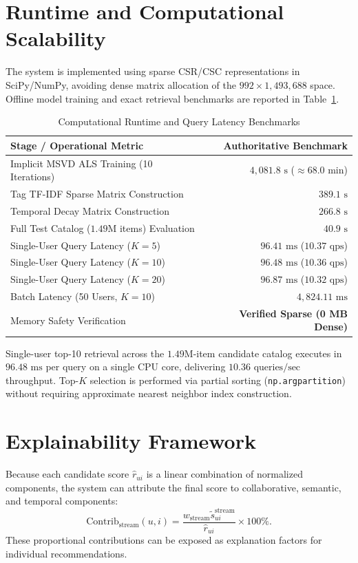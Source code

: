 \documentclass[conference]{IEEEtran}
\begin{document}
\section{Runtime and Computational Scalability}
The system is implemented using sparse CSR/CSC representations in SciPy/NumPy, avoiding dense matrix allocation of the $992 \times 1,493,688$ space. Offline model training and exact retrieval benchmarks are reported in Table~\ref{tab:runtime_benchmarks}.

\begin{table}[t]
\caption{Computational Runtime and Query Latency Benchmarks}
\label{tab:runtime_benchmarks}
\centering
\begin{tabular}{lr}
\toprule
\textbf{Stage / Operational Metric} & \textbf{Authoritative Benchmark} \\
\midrule
Implicit MSVD ALS Training (10 Iterations) & $4,081.8\text{ s}$ ($\approx 68.0\text{ min}$) \\
Tag TF-IDF Sparse Matrix Construction & $389.1\text{ s}$ \\
Temporal Decay Matrix Construction & $266.8\text{ s}$ \\
Full Test Catalog ($1.49\text{M}$ items) Evaluation & $40.9\text{ s}$ \\
\midrule
Single-User Query Latency ($K=5$) & $96.41\text{ ms}$ ($10.37\text{ qps}$) \\
Single-User Query Latency ($K=10$) & $96.48\text{ ms}$ ($10.36\text{ qps}$) \\
Single-User Query Latency ($K=20$) & $96.87\text{ ms}$ ($10.32\text{ qps}$) \\
Batch Latency (50 Users, $K=10$) & $4,824.11\text{ ms}$ \\
Memory Safety Verification & \textbf{Verified Sparse (0 MB Dense)} \\
\bottomrule
\end{tabular}
\end{table}

Single-user top-10 retrieval across the $1.49\text{M}$-item candidate catalog executes in $96.48\text{ ms}$ per query on a single CPU core, delivering $10.36\text{ queries/sec}$ throughput. Top-$K$ selection is performed via partial sorting (\texttt{np.argpartition}) without requiring approximate nearest neighbor index construction.

\section{Explainability Framework}
Because each candidate score $\hat{r}_{ui}$ is a linear combination of normalized components, the system can attribute the final score to collaborative, semantic, and temporal components:
\begin{equation}
\text{Contrib}_{\text{stream}}(u, i) = \frac{w_{\text{stream}} \tilde{s}_{ui}^{\text{stream}}}{\hat{r}_{ui}} \times 100\%.
\end{equation}
These proportional contributions can be exposed as explanation factors for individual recommendations.
\end{document}

